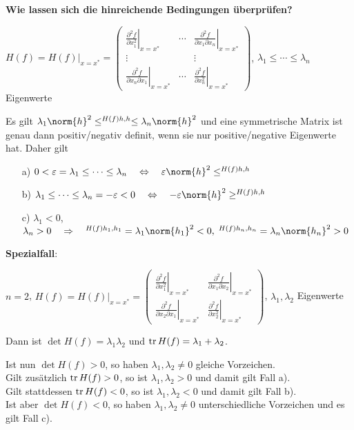 \linie

\textbf{Wie lassen sich die hinreichende Bedingungen überprüfen?}

$H(f) = \left.H(f)\right|_{x=x^\ast} = \begin{pmatrix}
\left.\frac{\partial^2 f}{\partial x_1^2}\right|_{x=x^\ast} &
\cdots &
\left.\frac{\partial^2 f}{\partial x_1 \partial x_n}\right|_{x=x^\ast} \\
\vdots & & \vdots \\
\left.\frac{\partial^2 f}{\partial x_n \partial x_1}\right|_{x=x^\ast} &
\cdots &
\left.\frac{\partial^2 f}{\partial x_n^2}\right|_{x=x^\ast}
\end{pmatrix}$,
$\lambda_1 \le \dotsb \le \lambda_n$ Eigenwerte

Es gilt $\lambda_1 \norm{h}^2 \le \sp{H(f)h, h} \le \lambda_n \norm{h}^2$
und eine symmetrische Matrix ist genau dann positiv/negativ definit, wenn
sie nur positive/negative Eigenwerte hat.
Daher gilt
\begin{itemize}
    \item[a)]
    $0 < \varepsilon = \lambda_1 \le \dotsb \le \lambda_n
    \quad\Leftrightarrow\quad \varepsilon \norm{h}^2 \le \sp{H(f)h, h}$
    
    \item[b)]
    $\lambda_1 \le \dotsb \le \lambda_n = -\varepsilon < 0
    \quad\Leftrightarrow\quad -\varepsilon \norm{h}^2 \ge \sp{H(f)h, h}$
    
    \item[c)]
    $\lambda_1 < 0$, $\lambda_n > 0
    \quad\Rightarrow\quad \sp{H(f)h_1, h_1} = \lambda_1 \norm{h_1}^2 < 0,\;
    \sp{H(f)h_n, h_n} = \lambda_n \norm{h_n}^2 > 0$
\end{itemize}

\linie

\textbf{Spezialfall}:

$n = 2$, $H(f) = \left.H(f)\right|_{x=x^\ast} = \begin{pmatrix}
\left.\frac{\partial^2 f}{\partial x_1^2}\right|_{x=x^\ast} &
\left.\frac{\partial^2 f}{\partial x_1 \partial x_2}\right|_{x=x^\ast} \\
\left.\frac{\partial^2 f}{\partial x_2 \partial x_1}\right|_{x=x^\ast} &
\left.\frac{\partial^2 f}{\partial x_2^2}\right|_{x=x^\ast}
\end{pmatrix}$,
$\lambda_1, \lambda_2$ Eigenwerte

Dann ist $\det H(f) = \lambda_1 \lambda_2$ und
$\operatorname{tr} H(f) = \lambda_1 + \lambda_2$.

Ist nun $\det H(f) > 0$, so haben $\lambda_1, \lambda_2 \not= 0$
gleiche Vorzeichen. \\
Gilt zusätzlich $\operatorname{tr} H(f) > 0$, so ist $\lambda_1, \lambda_2 > 0$ und damit
gilt Fall a). \\
Gilt stattdessen $\operatorname{tr} H(f) < 0$, so ist $\lambda_1, \lambda_2 < 0$ und damit
gilt Fall b). \\
Ist aber $\det H(f) < 0$, so haben $\lambda_1, \lambda_2 \not= 0$
unterschiedliche Vorzeichen und es gilt Fall c).

